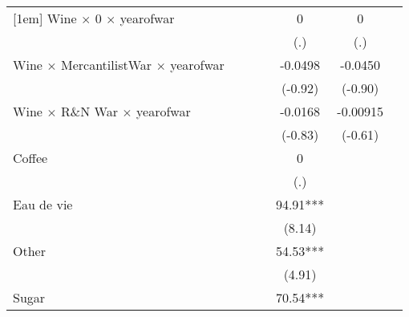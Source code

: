 {\begin{tabular}{l*{6}{c}}
[1em]
Wine $\times$ 0 $\times$ yearofwar&                     &                     &                     &           0         &           0         &                     \\
                    &                     &                     &                     &         (.)         &         (.)         &                     \\
[1em]
Wine $\times$ MercantilistWar $\times$ yearofwar&                     &                     &                     &     -0.0498         &     -0.0450         &                     \\
                    &                     &                     &                     &     (-0.92)         &     (-0.90)         &                     \\
[1em]
Wine $\times$ R\&N War $\times$ yearofwar&                     &                     &                     &     -0.0168         &    -0.00915         &                     \\
                    &                     &                     &                     &     (-0.83)         &     (-0.61)         &                     \\
[1em]
Coffee              &                     &                     &                     &           0         &                     &                     \\
                    &                     &                     &                     &         (.)         &                     &                     \\
[1em]
Eau de vie          &                     &                     &                     &       94.91***&                     &                     \\
                    &                     &                     &                     &      (8.14)         &                     &                     \\
[1em]
Other               &                     &                     &                     &       54.53***&                     &                     \\
                    &                     &                     &                     &      (4.91)         &                     &                     \\
[1em]
Sugar               &                     &                     &                     &       70.54***&                     &                     \\

\end{tabular}}
